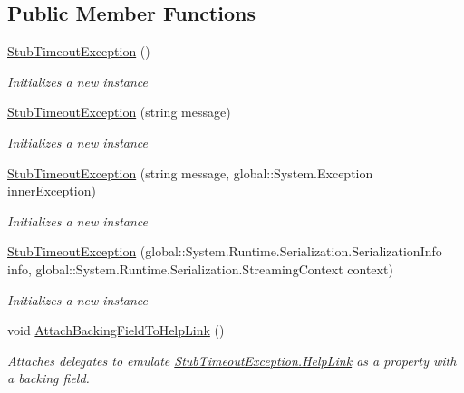 \subsection*{Public Member Functions}
\begin{DoxyCompactItemize}
\item 
\hyperlink{class_system_1_1_fakes_1_1_stub_timeout_exception_aded293af3e499b685af6f16e1d737045}{Stub\-Timeout\-Exception} ()
\begin{DoxyCompactList}\small\item\em Initializes a new instance\end{DoxyCompactList}\item 
\hyperlink{class_system_1_1_fakes_1_1_stub_timeout_exception_afe42fd87d1651b798fe2a399788d6b64}{Stub\-Timeout\-Exception} (string message)
\begin{DoxyCompactList}\small\item\em Initializes a new instance\end{DoxyCompactList}\item 
\hyperlink{class_system_1_1_fakes_1_1_stub_timeout_exception_a098ff45888f6718d301b107468faa13e}{Stub\-Timeout\-Exception} (string message, global\-::\-System.\-Exception inner\-Exception)
\begin{DoxyCompactList}\small\item\em Initializes a new instance\end{DoxyCompactList}\item 
\hyperlink{class_system_1_1_fakes_1_1_stub_timeout_exception_ade2ac185cf3058f1cb24ba153a0af75e}{Stub\-Timeout\-Exception} (global\-::\-System.\-Runtime.\-Serialization.\-Serialization\-Info info, global\-::\-System.\-Runtime.\-Serialization.\-Streaming\-Context context)
\begin{DoxyCompactList}\small\item\em Initializes a new instance\end{DoxyCompactList}\item 
void \hyperlink{class_system_1_1_fakes_1_1_stub_timeout_exception_a46c5f43d096dad9580693c45b9ca5d63}{Attach\-Backing\-Field\-To\-Help\-Link} ()
\begin{DoxyCompactList}\small\item\em Attaches delegates to emulate \hyperlink{class_system_1_1_fakes_1_1_stub_timeout_exception_a9fcdc30e427001a2b8efd146a3f65496}{Stub\-Timeout\-Exception.\-Help\-Link} as a property with a backing field.\end{DoxyCompactList}\item 

\end{DoxyCompactItemize}
